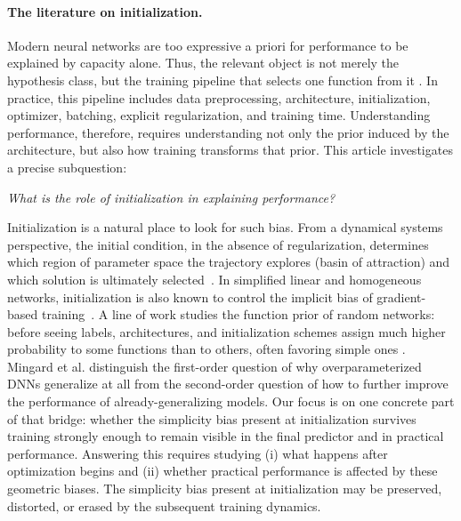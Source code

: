 \documentclass{article}
\begin{document}
\paragraph{The literature on initialization.}
Modern neural networks are too expressive a priori for performance to be explained by capacity alone. Thus, the relevant object is not merely the hypothesis class, but the training pipeline that selects one function from it \citep{zhang2021understanding}.  In practice, this
pipeline includes data preprocessing, architecture, initialization, optimizer,
batching, explicit regularization, and training time.  Understanding performance, therefore, requires understanding not only the prior induced by the architecture, but also how training transforms that prior. This article investigates a precise subquestion:
\vspace{-0.3em}
\begin{center}
    \textit{What is the role of initialization in explaining performance?}
\end{center}
\vspace{-0.3em}
Initialization is a natural place to look for such bias. From a dynamical
systems perspective, the initial condition, in the absence of regularization, determines which region of parameter space the trajectory explores (basin of attraction) and which solution is ultimately selected~\citep{strogatz2015nonlinear,hirsch2013differential}.
In simplified linear and homogeneous networks, initialization is also known to
control the implicit bias of gradient-based training~\citep{min2021explicit,gruber2024role}.
A line of work studies the function prior of random networks: before seeing labels, architectures, and initialization schemes assign much higher probability to some functions than to others, often favoring simple ones \citep{valle2019deep,mingard2025occam, fink2026deep}.
Mingard et al. \citep{mingard2025occam} distinguish the first-order question of why overparameterized DNNs generalize at all from the second-order question of how to further improve the performance of already-generalizing models. Our focus is on one concrete part of that bridge: whether the simplicity bias present at initialization survives training strongly enough to remain visible in the final predictor and in practical performance. Answering this requires studying (i) what happens after optimization begins and (ii) whether practical performance is affected by these geometric biases. The simplicity bias present at initialization may be
preserved, distorted, or erased by the subsequent training dynamics. 
\end{document}

